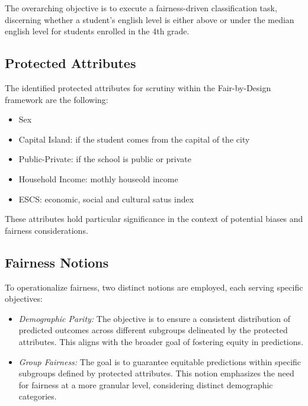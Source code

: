 The overarching objective is to execute a fairness-driven classification task, discerning whether a student's english level is either above or under the median english level for students enrolled in the 4th grade.

\subsection{Protected Attributes}

The identified protected attributes for scrutiny within the Fair-by-Design framework are the following:

\begin{itemize}

    \item Sex

    \item Capital Island: if the student comes from the capital of the city

    \item Public-Private: if the school is public or private
    
    \item Household Income: mothly houseold income

    \item ESCS: economic, social and cultural satus index

\end{itemize}

These attributes hold particular significance in the context of potential biases and fairness considerations.

\subsection{Fairness Notions}

To operationalize fairness, two distinct notions are employed, each serving specific objectives:

\begin{itemize}
    \item \emph{Demographic Parity:} The objective is to ensure a consistent distribution of predicted outcomes across different subgroups delineated by the protected attributes. This aligns with the broader goal of fostering equity in predictions.

    \item \emph{Group Fairness:} The goal is to guarantee equitable predictions within specific subgroups defined by protected attributes. This notion emphasizes the need for fairness at a more granular level, considering distinct demographic categories.
\end{itemize}

